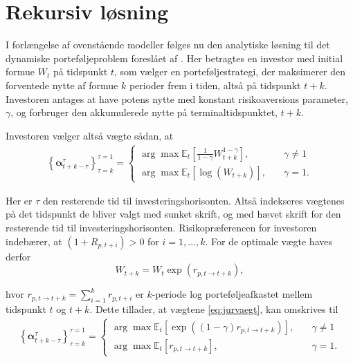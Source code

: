 \documentclass[
  a4paper,
  oneside]{memoir}
\begin{document}
\hypertarget{rekloes}{%
\section{Rekursiv løsning}\label{rekloes}}

I forlængelse af ovenstående modeller følges nu den analytiske løsning til det dynamiske porteføljeproblem foreslået af \citep{JurVic2011}. Her betragtes en investor med initial formue \(W_t\) på tidspunkt \(t\), som vælger en porteføljestrategi, der maksimerer den forventede nytte af formue \(k\) perioder frem i tiden, altså på tidspunkt \(t+k\). Investoren antages at have potens nytte med konstant risikoaversions parameter, \(\gamma\), og forbruger den akkumulerede nytte på terminaltidspunktet, \(t+k\).

Investoren vælger altså vægte sådan, at
\begin{align}
\left\{\bm{\alpha}_{t+k-\tau}^\tau\right\}_{\tau=k}^{\tau=1}=
\begin{cases}
\arg\max\mathbb{E}_t\left[\frac{1}{1-\gamma}W_{t+k}^{1-\gamma}\right],\quad &\gamma\neq 1\\
\arg\max\mathbb{E}_t\left[\log(W_{t+k})\right],\quad &\gamma=1.
\end{cases}\label{eq:jurvaegt}
\end{align}

Her er \(\tau\) den resterende tid til investeringshorisonten. Altså indekseres vægtenes på det tidspunkt de bliver valgt med sunket skrift, og med hævet skrift for den resterende tid til investeringshorisonten. Risikopræferencen for investoren indebærer, at \((1+R_{p,t+i})>0\) for \(i=1,\dots,k\). For de optimale vægte haves derfor
\begin{equation}
W_{t+k}=W_t\exp(r_{p,t\to t+k}),\label{eq:formuetk}
\end{equation}

hvor \(r_{p,t\to t+k}=\sum_{i=1}^k r_{p,t+i}\) er \(k\)-periode log porteføljeafkastet mellem tidspunkt \(t\) og \(t+k\). Dette tillader, at vægtene \eqref{eq:jurvaegt}, kan omskrives til
\begin{align}
\left\{\bm{\alpha}_{t+k-\tau}^\tau\right\}_{\tau=k}^{\tau=1}=\begin{cases}
\arg\max\mathbb{E}_t\left[\exp ((1-\gamma) r_{p,t\to t+k})\right],\quad &\gamma\neq 1\\
\arg\max\mathbb{E}_t\left[r_{p,t\to t+k}\right],\quad &\gamma=1.
\end{cases}\label{eq:jurvaegt2}
\end{align}
\end{document}
